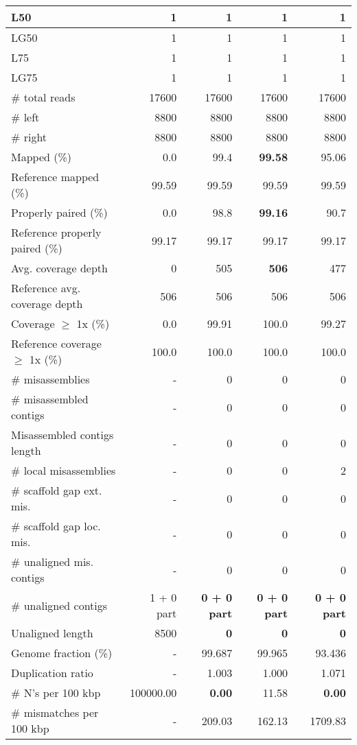 \documentclass[12pt,a4paper]{article}
\begin{document}
\begin{table}[ht]
\begin{center}
\begin{tabular}{|l*{4}{|r}|}
L50 & 1 & 1 & 1 & 1 \\ \hline
LG50 & 1 & 1 & 1 & 1 \\ \hline
L75 & 1 & 1 & 1 & 1 \\ \hline
LG75 & 1 & 1 & 1 & 1 \\ \hline
\# total reads & 17600 & 17600 & 17600 & 17600 \\ \hline
\# left & 8800 & 8800 & 8800 & 8800 \\ \hline
\# right & 8800 & 8800 & 8800 & 8800 \\ \hline
Mapped (\%) & 0.0 & 99.4 & {\bf 99.58} & 95.06 \\ \hline
Reference mapped (\%) & 99.59 & 99.59 & 99.59 & 99.59 \\ \hline
Properly paired (\%) & 0.0 & 98.8 & {\bf 99.16} & 90.7 \\ \hline
Reference properly paired (\%) & 99.17 & 99.17 & 99.17 & 99.17 \\ \hline
Avg. coverage depth & 0 & 505 & {\bf 506} & 477 \\ \hline
Reference avg. coverage depth & 506 & 506 & 506 & 506 \\ \hline
Coverage $\geq$ 1x (\%) & 0.0 & 99.91 & 100.0 & 99.27 \\ \hline
Reference coverage $\geq$ 1x (\%) & 100.0 & 100.0 & 100.0 & 100.0 \\ \hline
\# misassemblies & - & 0 & 0 & 0 \\ \hline
\# misassembled contigs & - & 0 & 0 & 0 \\ \hline
Misassembled contigs length & - & 0 & 0 & 0 \\ \hline
\# local misassemblies & - & 0 & 0 & 2 \\ \hline
\# scaffold gap ext. mis. & - & 0 & 0 & 0 \\ \hline
\# scaffold gap loc. mis. & - & 0 & 0 & 0 \\ \hline
\# unaligned mis. contigs & - & 0 & 0 & 0 \\ \hline
\# unaligned contigs & 1 + 0 part & {\bf 0 + 0 part} & {\bf 0 + 0 part} & {\bf 0 + 0 part} \\ \hline
Unaligned length & 8500 & {\bf 0} & {\bf 0} & {\bf 0} \\ \hline
Genome fraction (\%) & - & 99.687 & 99.965 & 93.436 \\ \hline
Duplication ratio & - & 1.003 & 1.000 & 1.071 \\ \hline
\# N's per 100 kbp & 100000.00 & {\bf 0.00} & 11.58 & {\bf 0.00} \\ \hline
\# mismatches per 100 kbp & - & 209.03 & 162.13 & 1709.83 \\ \hline

\end{tabular}
\end{center}
\end{table}
\end{document}
